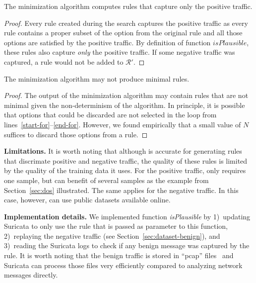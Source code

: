 \documentclass[sigconf,review, anonymous]{acmart}
\begin{document}
\begin{theorem}
  The minimization algorithm computes rules that capture only
  the positive traffic.
\end{theorem}
\begin{proof}
  Every rule created during the search captures the positive traffic
  as every rule contains a proper subset of the option from the
  original rule and all those options are satisfied by the positive
  traffic. By definition of function $\mathit{isPlausible}$, these rules
  also capture \emph{only} the positive traffic. If some negative
  traffic was captured, a rule would not be added to $\mathcal
  R'$.
\end{proof}

\begin{proposition}
  The minimization algorithm may not produce minimal rules.
\end{proposition}

\begin{proof}
The output of the minimization algorithm may contain rules that are
not minimal given the non-determinism of the algorithm. In principle,
it is possible that options that could be discarded are not selected
in the loop from lines~\ref{start-for}--\ref{end-for}. However, we
found empirically that a small value of $N$ suffices to discard those
options from a rule.
\end{proof}


\vspace{2ex}
\noindent\textbf{Limitations.} It is worth noting that although
\tname{} is accurate for generating rules that discrimate positive and
negative traffic, the quality of these rules is limited by the quality
of the training data it uses. For the positive traffic, \tname{} only
requires one sample, but can benefit of several samples as the example
from Section~\ref{sec:dos} illustrated. The same applies for the
negative traffic. In this case, however, \tname{} can use public
datasets available online.

\vspace{2ex}
\noindent\textbf{Implementation details.} We implemented function
\emph{isPlausible} by 1)~updating Suricata to only use the rule that
is passed as parameter to this function, 2)~replaying the negative
traffic (see Section~\ref{sec:dataset-benign}), and 3)~reading the
Suricata logs to check if any benign message was captured by the
rule. It is worth noting that the benign traffic is stored in ``pcap''
files~\cite{pcap} and Suricata can process those files very
efficiently compared to analyzing network messages directly.
\end{document}
